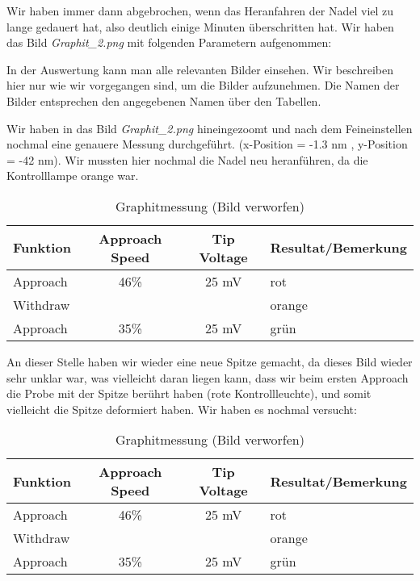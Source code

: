 Wir haben immer dann abgebrochen, wenn das Heranfahren der Nadel viel zu lange gedauert hat, also deutlich einige Minuten überschritten hat. Wir haben das Bild \emph{Graphit\_2.png} mit folgenden Parametern aufgenommen: 


In der Auswertung kann man alle relevanten Bilder einsehen. Wir beschreiben hier nur wie wir vorgegangen sind, um die Bilder aufzunehmen. Die Namen der Bilder entsprechen den angegebenen Namen über den Tabellen.

Wir haben in das Bild \emph{Graphit\_2.png} hineingezoomt und nach dem Feineinstellen nochmal eine genauere Messung durchgeführt. (x-Position = -1.3 nm , y-Position = -42 nm). Wir mussten hier nochmal die Nadel neu heranführen, da die Kontrolllampe orange war. 

\begin{table}[H]
\caption{Graphitmessung (Bild verworfen)}
\centering \begin{tabular}[H]{l c c l}
Funktion & Approach Speed & Tip Voltage & Resultat/Bemerkung\\ \hline 
Approach & 46\% & 25 mV & rot\\
Withdraw & & & orange\\
Approach & 35\% & 25 mV & grün\\
\end{tabular}
\end{table}


An dieser Stelle haben wir wieder eine neue Spitze gemacht, da dieses Bild wieder sehr unklar war, was vielleicht daran liegen kann, dass wir beim ersten Approach die Probe mit der Spitze berührt haben (rote Kontrollleuchte), und somit vielleicht die Spitze deformiert haben. Wir haben es nochmal versucht:

\begin{table}[H]
\caption{Graphitmessung (Bild verworfen)}
\centering \begin{tabular}[H]{l c c l} 
Funktion & Approach Speed & Tip Voltage & Resultat/Bemerkung\\ \hline
Approach & 46\% & 25 mV & rot\\
Withdraw & & & orange\\
Approach & 35\% & 25 mV & grün\\
\end{tabular}
\end{table}



